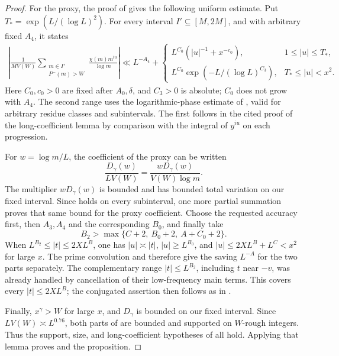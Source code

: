 \begin{proof}
For the proxy, the proof of
\cite[Lemma~5.2]{PoissonDirichlet} gives the following uniform estimate.
Put \(T_* =\exp(L/(\log L)^2)\).  For every interval
\(I'\subseteq[M,2M]\), and with arbitrary fixed \(A_4\), it states
\begin{equation}\label{eq:rough-high-source}
 \begin{split}
 \left|\frac1{M V(W)}
     \sum_{\substack{m\in I'\\P^-(m)>W}}
                \frac{\chi(m)m^{iu}}{\log m}\right|
 \ll L^{-A_4}+{}
 \begin{cases}
 L^{C_0}(|u|^{-1}+x^{-c_0}),&1\le|u|\le T_*,\\
 L^{C_0}\exp(-L/(\log L)^{C_3}),&T_*\le|u|<x^2.
 \end{cases}
 \end{split}
\end{equation}
Here \(C_0,c_0>0\) are fixed after \(A_0,\delta\), and \(C_3>0\) is
absolute; \(C_0\) does not grow with \(A_4\).  The second range uses
the logarithmic-phase estimate of
\cite[Lemma~3.3]{PrimePredecessors}, valid for arbitrary residue
classes and subintervals.  The first follows in the cited proof of
the long-coefficient lemma by comparison with the integral of
\(y^{iu}\) on each progression.

For \(w=\log m/L\), the coefficient of the proxy can be written
\[
 \frac{D_\gamma(w)}{L V(W)}
       =\frac{wD_\gamma(w)}{V(W)\log m}.
\]
The multiplier \(wD_\gamma(w)\) is bounded and has bounded total
variation on our fixed interval.  Since 
holds on every subinterval, one more partial summation proves that same
bound for the proxy coefficient.  Choose the requested accuracy first,
then \(A_3,A_4\) and the corresponding \(B_0\), and finally take
\[
 B_2>\max\{C+2,\ B_0+2,\ A+C_0+2\}.
\]
When \(L^{B_2}\le|t|\le2XL^B\), one has
\(|u|\asymp|t|\), \(|u|\ge L^{B_0}\), and
\(|u|\le2XL^B+L^C<x^2\) for large \(x\).  The prime convolution and
 therefore give the saving \(L^{-A}\)
for the two parts separately.  The complementary range
\(|t|\le L^{B_2}\), including \(t\) near \(-v\), was already handled
by cancellation of their low-frequency main terms.  This covers every
\(|t|\le2XL^B\); the conjugated assertion then follows as in
.

Finally, \(x^\gamma>W\) for large \(x\), and \(D_\gamma\) is bounded
on our fixed interval.  Since \(LV(W)\asymp L^{0.76}\), both parts of
 are bounded and supported on
\(W\)-rough integers.  Thus the support, size, and long-coefficient
hypotheses of
 all hold.  Applying that lemma
proves  and the proposition.
\end{proof}
